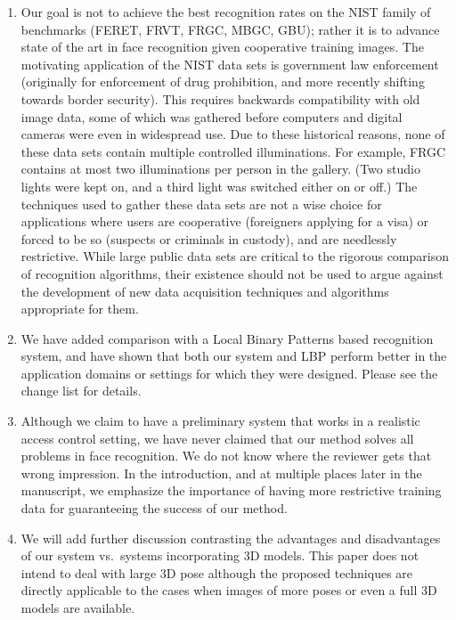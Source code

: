 \documentclass[11pt]{article}
\begin{document}
\begin{enumerate}
\item Our goal is not to achieve the best recognition rates on the NIST family of
benchmarks (FERET, FRVT, FRGC, MBGC, GBU); rather it is to advance state of
the art in face recognition given cooperative training images.  The motivating
application of the NIST data sets is government law enforcement (originally for
enforcement of drug prohibition, and more recently shifting towards border
security).  This requires backwards compatibility with old image data, some of
which was gathered before computers and digital cameras were even in widespread use.
Due to these historical reasons, none of these data sets contain multiple controlled
illuminations.  For example, FRGC contains at most two illuminations per person
in the gallery.  (Two studio lights were kept on, and a third light was
switched either on or off.) The techniques used to gather these data sets are not a wise
choice for applications where users are cooperative (foreigners applying for a visa)
or forced to be so (suspects or criminals in custody), and are needlessly
restrictive.  While large public data sets are critical to the rigorous
comparison of recognition algorithms, their existence should not be used to
argue against the development of new data acquisition techniques and algorithms
appropriate for them.

\item We have added comparison with a Local Binary Patterns based recognition system, and
have shown that both our system and LBP perform better in the application domains or settings
for which they were designed.  Please see the change list for details.

\item Although we claim to have a preliminary system that works in a realistic
access control setting, we have never claimed that our method solves all problems in face
recognition. We do not know where the reviewer gets that wrong impression.
In the introduction, and at multiple places later in the manuscript, we emphasize
the importance of having more restrictive training data for guaranteeing the success
of our method.


\item We will add further discussion contrasting the advantages and disadvantages of our
system vs.\ systems incorporating 3D models. This paper does not intend to deal with large 3D pose
although the proposed techniques are directly applicable to the cases when images of more poses or
even a full 3D models are available.


\end{enumerate}
\end{document}
